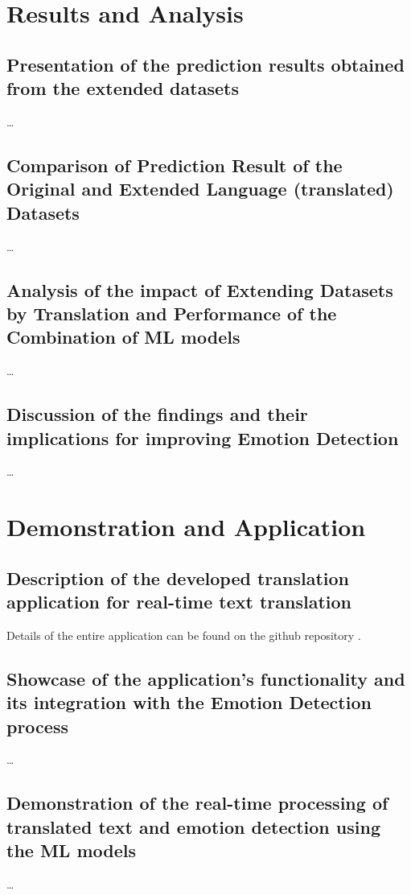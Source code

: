 \documentclass[11pt]{article}
\begin{document}
\section{Results and Analysis}

\subsection{Presentation of the prediction results obtained from the extended datasets}

\ldots

\subsection{Comparison of Prediction Result of the Original and Extended Language (translated) Datasets}
\ldots

\subsection{Analysis of the impact of Extending Datasets by Translation and Performance of the Combination of ML models}
\ldots

\subsection{Discussion of the findings and their implications for improving Emotion Detection}
\ldots

\section{Demonstration and Application}

\subsection{Description of the developed translation application for real-time text translation}
Details of the entire application can be found on the github repository \cite{Hoehn_Improving_Emotion_Detection_2023}.

\subsection{Showcase of the application's functionality and its integration with the Emotion Detection process}
\ldots

\subsection{Demonstration of the real-time processing of translated text and emotion detection using the ML models}
\ldots
\end{document}
